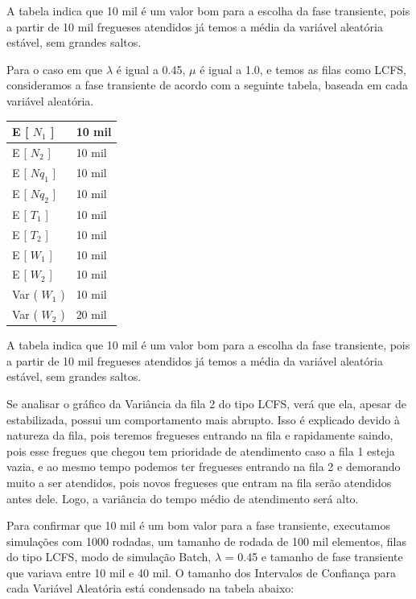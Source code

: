 \documentclass[a4paper,10pt]{article}
\begin{document}
    A tabela indica que 10 mil é um valor bom para a escolha da fase transiente, pois a partir de 10 mil fregueses atendidos já temos a média da
variável aleatória estável, sem grandes saltos.

    Para o caso em que $\lambda$ é igual a 0.45, $\mu$ é igual a 1.0, e temos as filas como LCFS, consideramos a fase transiente de acordo com a seguinte
tabela, baseada em cada variável aleatória.

\begin{center}
\begin{tabular} { | l | l | }
    \hline
    E [ $N_1$ ]  & 10 mil \\ \hline
    E [ $N_2$ ] & 10 mil \\ \hline
    E [ $Nq_1$ ] & 10 mil \\ \hline
    E [ $Nq_2$ ]	& 10 mil \\ \hline
    E [ $T_1$ ] & 10 mil \\ \hline
    E [ $T_2$ ] & 10 mil \\ \hline
    E [ $W_1$ ] & 10 mil \\ \hline
    E [ $W_2$ ] & 10 mil \\ \hline
    Var ( $W_1$ ) & 10 mil \\ \hline
    Var ( $W_2$ ) & 20 mil \\ \hline
\end{tabular}
\end{center}

    A tabela indica que 10 mil é um valor bom para a escolha da fase transiente, pois a partir de 10 mil fregueses atendidos já temos a média da variável
aleatória estável, sem grandes saltos.

    Se analisar o gráfico da Variância da fila 2 do tipo LCFS, verá que ela, apesar de estabilizada, possui um comportamento mais abrupto. Isso é explicado devido à
natureza da fila, pois teremos fregueses entrando na fila e rapidamente saindo, pois esse fregues que chegou tem prioridade de atendimento caso a fila 1 esteja vazia,
e ao mesmo tempo podemos ter fregueses entrando na fila 2 e demorando muito a ser atendidos, pois novos fregueses que entram na fila serão atendidos antes dele. Logo,
a variância do tempo médio de atendimento será alto.

    Para confirmar que 10 mil é um bom valor para a fase transiente, executamos simulações com 1000 rodadas, um tamanho de rodada de 100 mil elementos, filas do tipo LCFS,
modo de simulação Batch, $\lambda$ = 0.45 e tamanho de fase transiente que variava entre 10 mil e 40 mil. O tamanho dos Intervalos de Confiança para cada Variável Aleatória está condensado na
tabela abaixo:
\end{document}
